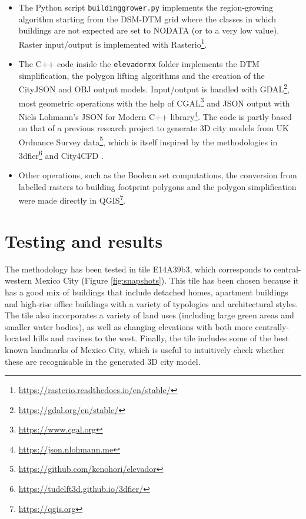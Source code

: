 \documentclass{isprs} %
\begin{document}
\begin{itemize}
    \item The Python script \texttt{buildinggrower.py} implements the region-growing algorithm starting from the DSM-DTM grid where the classes in which buildings are not expected are set to NODATA (or to a very low value). Raster input/output is implemented with Rasterio\footnote{\url{https://rasterio.readthedocs.io/en/stable/}}.
    \item The C++ code inside the \texttt{elevadormx} folder implements the DTM simplification, the polygon lifting algorithms and the creation of the CityJSON and OBJ output models. Input/output is handled with GDAL\footnote{\url{https://gdal.org/en/stable/}}, most geometric operations with the help of CGAL\footnote{\url{https://www.cgal.org}} and JSON output with Niels Lohmann's JSON for Modern C++ library\footnote{\url{https://json.nlohmann.me}}. The code is partly based on that of a previous research project to generate 3D city models from UK Ordnance Survey data\footnote{\url{https://github.com/kenohori/elevador}}, which is itself inspired by the methodologies in 3dfier\footnote{\url{https://tudelft3d.github.io/3dfier/}} \citep{Ledoux21} and City4CFD \citep{Paden2022,Paden2024}.
    \item Other operations, such as the Boolean set computations, the conversion from labelled rasters to building footprint polygons and the polygon simplification were made directly in QGIS\footnote{\url{https://qgis.org}}.
\end{itemize}

\section{Testing and results}
\label{sec:results}

The methodology has been tested in tile E14A39b3, which corresponds to central-western Mexico City (Figure \ref{fig:snapshots}).
This tile has been chosen because it has a good mix of buildings that include detached homes, apartment buildings and high-rise office buildings with a variety of typologies and architectural styles.
The tile also incorporates a variety of land uses (including large green areas and smaller water bodies), as well as changing elevations with both more centrally-located hills and ravines to the west.
Finally, the tile includes some of the best known landmarks of Mexico City, which is useful to intuitively check whether these are recognisable in the generated 3D city model.
\end{document}
